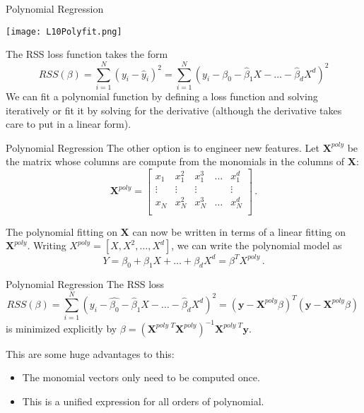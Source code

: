 \documentclass[10pt, table, dvipsnames,xcdraw, handout]{beamer}
\begin{document}
\begin{frame}[fragile]{Polynomial Regression}
  \begin{minipage}[t][0.5\textheight][t]{\textwidth}
	\centering \texttt{[image: L10Polyfit.png]}
  \end{minipage}
  \vfill
\begin{minipage}[t][0.5\textheight][t]{\textwidth}
The RSS loss function takes the form 
$$
RSS(\beta) = \sum_{i=1}^N (y_i - \hat{y}_i)^2 = \sum_{i=1}^N (y_i - \hat{\beta_0} - \hat{\beta}_1X - \ldots - \hat{\beta}_dX^d)^2
$$
We can fit a polynomial function by defining a loss function and solving iteratively or fit it by solving for the derivative (although the derivative takes care to put in a linear form). 
\end{minipage}
\end{frame}



\begin{frame}[fragile]{Polynomial Regression}
The other option is to engineer new features. Let $\mathbf{X}^{poly}$ be the matrix whose columns are compute from the monomials in the columns of $\mathbf{X}$:
$$
\mathbf{X}^{poly} = 
\left[
\begin{matrix}
x_1 & x_1^2 & x_1^3 & \ldots & x_1^d\\
\vdots &\vdots&\vdots&&\vdots\\
x_N & x_N^2 & x_N^3 & \ldots & x_N^d\\
\end{matrix}
\right]\,.
$$\pause

The polynomial fitting on $\mathbf{X}$ can now be written in terms of a linear fitting on $\mathbf{X}^{poly}$. Writing $X^{poly} = [X,X^2,\ldots, X^d]$, we can write the polynomial model as
$$
Y = \beta_0 + \beta_1X + \ldots + \beta_dX^d = \beta^T X^{poly}\,.
$$
\end{frame}



\begin{frame}[fragile]{Polynomial Regression}
The RSS loss 
$$
RSS(\beta) = \sum_{i=1}^N (y_i - \hat{\beta_0} - \hat{\beta}_1X - \ldots - \hat{\beta}_dX^d)^2 = (\mathbf{y} - \mathbf{X}^{poly}\beta)^T(\mathbf{y} - \mathbf{X}^{poly}\beta)\,
$$
is minimized explicitly by $\beta = (\mathbf{X}^{poly\,\,T} \mathbf{X}^{poly})^{-1} \mathbf{X}^{poly\,\,T}\mathbf{y}$. 

This are some huge advantages to this:

\begin{itemize}
\item The monomial vectors only need to be computed once.
\item This is a unified expression for all orders of polynomial. 
\end{itemize}
\end{frame}
\end{document}
